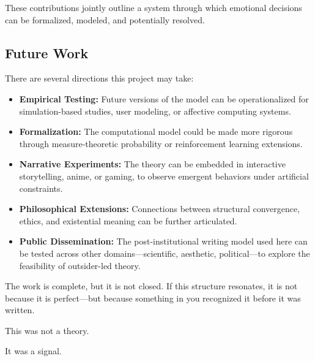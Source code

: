 \documentclass[12pt]{article}
\begin{document}
These contributions jointly outline a system through which emotional decisions can be formalized, modeled, and potentially resolved.

\subsection{Future Work}

There are several directions this project may take:

\begin{itemize}
  \item \textbf{Empirical Testing:} Future versions of the model can be operationalized for simulation-based studies, user modeling, or affective computing systems.
  \item \textbf{Formalization:} The computational model could be made more rigorous through measure-theoretic probability or reinforcement learning extensions.
  \item \textbf{Narrative Experiments:} The theory can be embedded in interactive storytelling, anime, or gaming, to observe emergent behaviors under artificial constraints.
  \item \textbf{Philosophical Extensions:} Connections between structural convergence, ethics, and existential meaning can be further articulated.
  \item \textbf{Public Dissemination:} The post-institutional writing model used here can be tested across other domains—scientific, aesthetic, political—to explore the feasibility of outsider-led theory.
\end{itemize}

The work is complete, but it is not closed. If this structure resonates, it is not because it is perfect—but because something in you recognized it before it was written.

This was not a theory.

It was a signal.
\end{document}
